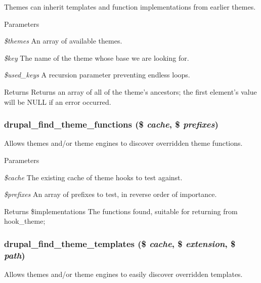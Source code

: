 Themes can inherit templates and function implementations from earlier themes.


\begin{DoxyParams}{Parameters}
\item[{\em \$themes}]An array of available themes. \item[{\em \$key}]The name of the theme whose base we are looking for. \item[{\em \$used\_\-keys}]A recursion parameter preventing endless loops. \end{DoxyParams}
\begin{DoxyReturn}{Returns}
Returns an array of all of the theme's ancestors; the first element's value will be NULL if an error occurred. 
\end{DoxyReturn}
\hypertarget{includes_2theme_8inc_a38b3ec5ba23e776b29f3f907a75711f1}{
\subsubsection[{drupal\_\-find\_\-theme\_\-functions}]{\setlength{\rightskip}{0pt plus 5cm}drupal\_\-find\_\-theme\_\-functions (\$ {\em cache}, \/  \$ {\em prefixes})}}
\label{includes_2theme_8inc_a38b3ec5ba23e776b29f3f907a75711f1}
Allows themes and/or theme engines to discover overridden theme functions.


\begin{DoxyParams}{Parameters}
\item[{\em \$cache}]The existing cache of theme hooks to test against. \item[{\em \$prefixes}]An array of prefixes to test, in reverse order of importance.\end{DoxyParams}
\begin{DoxyReturn}{Returns}
\$implementations The functions found, suitable for returning from hook\_\-theme; 
\end{DoxyReturn}
\hypertarget{includes_2theme_8inc_aa755f6e8f11a62c9e90a6d7af55145b1}{
\subsubsection[{drupal\_\-find\_\-theme\_\-templates}]{\setlength{\rightskip}{0pt plus 5cm}drupal\_\-find\_\-theme\_\-templates (\$ {\em cache}, \/  \$ {\em extension}, \/  \$ {\em path})}}
\label{includes_2theme_8inc_aa755f6e8f11a62c9e90a6d7af55145b1}
Allows themes and/or theme engines to easily discover overridden templates.


